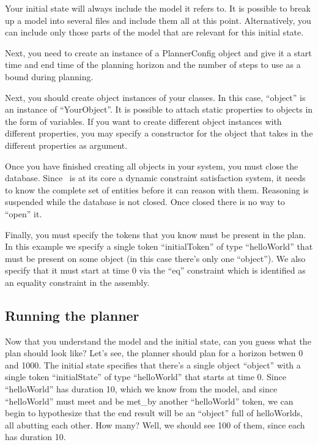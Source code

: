\documentclass[10pt, letterpaper, twoside]{article}
\begin{document}
Your initial state will always include the model it refers to.  It is
possible to break up a model into several files and include them all at
this point.  Alternatively, you can include only those parts of the model
that are relevant for this initial state.

Next, you need to create an instance of a PlannerConfig object and give it
a start time and end time of the planning horizon and the number of steps
to use as a bound during planning.  

Next, you should create object instances of your classes.  In this case,
``object'' is an instance of ``YourObject''.  It is possible to attach
static properties to objects in the form of variables.  If you want to
create different object instances with different properties, you may
specify a constructor for the object that takes in the different properties
as argument. 

Once you have finished creating all objects in your system, you must close
the database.  Since \ET\, is at its core a dynamic constraint satisfaction
system, it needs to know the complete set of entities before it can reason
with them.  Reasoning is suspended while the database is not closed.  Once
closed there is no way to ``open'' it.

Finally, you must specify the tokens that you know must be present in the
plan.  In this example we specify a single token ``initialToken'' of type
``helloWorld'' that must be present on some object (in this case there's
only one ``object'').  We also specify that it must start at time 0 via the
``eq'' constraint which is identified as an equality constraint in the
assembly. 

\subsection{Running the planner}
\label{execution}
Now that you understand the model and the initial state, can you guess what
the plan should look like?  Let's see, the planner should plan for a
horizon betwen 0 and 1000.  The initial state specifies that there's a
single object ``object'' with a single token ``initialState'' of type
``helloWorld'' that starts at time 0.  Since ``helloWorld'' has duration
10, which we know from the model, and since ``helloWorld'' must meet and be
met\_by another ``helloWorld'' token, we can begin to hypothesize that the
end result will be an ``object'' full of helloWorlds, all abutting each
other.  How many? Well, we should see 100 of them, since each has duration 10.
\end{document}
